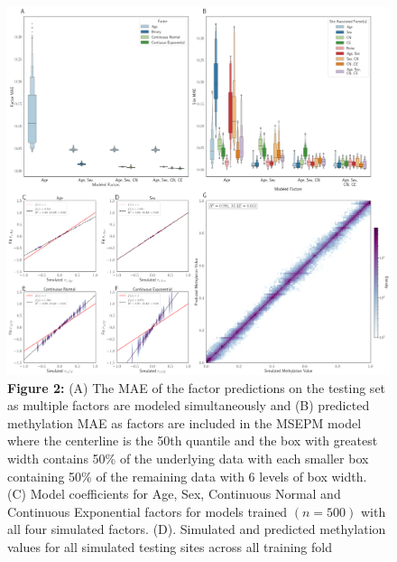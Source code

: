 \documentclass{article}
\begin{document}
{\begin{center}
    \begin{figure}
    \includegraphics[scale=.2]{Figures/Figure2.png}
    \footnotesize
    \caption*{\small \textbf{Figure 2:} (A) The MAE of the factor predictions on the testing set as multiple factors are modeled simultaneously and 
    (B) predicted methylation MAE as factors are included in the MSEPM model where the centerline is the 50th quantile and the box 
    with greatest width contains 50\% of the underlying data with each smaller box containing 50\% of the remaining data 
    with 6 levels of box width. (C) Model coefficients for 
Age, Sex, Continuous Normal and Continuous Exponential factors for models trained $(n = 500)$ with all four simulated 
factors. (D). Simulated and predicted methylation values for all simulated testing sites across all training fold }
    \end{figure}
\end{center}


}
\end{document}
